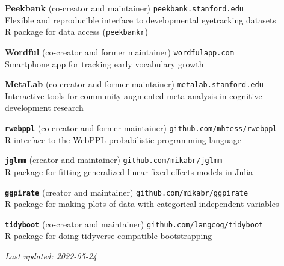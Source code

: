 \documentclass[11pt,]{article}
\begin{document}
\textbf{Peekbank} (co-creator and maintainer)
\hfill \texttt{peekbank.stanford.edu}\\
\hspace*{0.333em}\hspace*{0.333em}\hspace*{0.333em}Flexible and
reproducible interface to developmental eyetracking datasets \\
\hspace*{0.333em}\hspace*{0.333em}\hspace*{0.333em}R package for data
access (\texttt{peekbankr})

\textbf{Wordful} (co-creator and former maintainer)
\hfill \texttt{wordfulapp.com}\\
\hspace*{0.333em}\hspace*{0.333em}\hspace*{0.333em}Smartphone app for
tracking early vocabulary growth

\textbf{MetaLab} (co-creator and former maintainer)
\hfill \texttt{metalab.stanford.edu}\\
\hspace*{0.333em}\hspace*{0.333em}\hspace*{0.333em}Interactive tools for
community-augmented meta-analysis in cognitive development research

\textbf{\texttt{rwebppl}} (co-creator and former maintainer)
\hfill \texttt{github.com/mhtess/rwebppl}\\
\hspace*{0.333em}\hspace*{0.333em}\hspace*{0.333em}R interface to the
WebPPL probabilistic programming language

\textbf{\texttt{jglmm}} (creator and maintainer)
\hfill \texttt{github.com/mikabr/jglmm}\\
\hspace*{0.333em}\hspace*{0.333em}\hspace*{0.333em}R package for fitting
generalized linear fixed effects models in Julia

\textbf{\texttt{ggpirate}} (creator and maintainer)
\hfill \texttt{github.com/mikabr/ggpirate}\\
\hspace*{0.333em}\hspace*{0.333em}\hspace*{0.333em}R package for making
plots of data with categorical independent variables

\textbf{\texttt{tidyboot}} (co-creator and maintainer)
\hfill \texttt{github.com/langcog/tidyboot}\\
\hspace*{0.333em}\hspace*{0.333em}\hspace*{0.333em}R package for doing
tidyverse-compatible bootstrapping

\centering
\vspace{2em}

\emph{Last updated: 2022-05-24}
\end{document}
